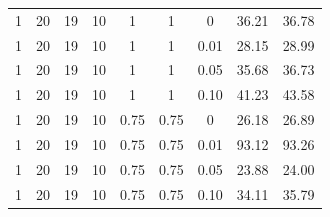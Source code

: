 \begin{table}[H]
\begin{tabular}{cccccccrr}
	1  			& 20     			& 19			& 10				& 1						& 1      				& 0			      		& 36.21 				& 36.78\\ 
	1      		& 20     			& 19     		& 10     			& 1      				& 1      				& 0.01    				& 28.15    				& 28.99\\ 
	1      		& 20     			& 19     		& 10     			& 1      				& 1      				& 0.05    				& 35.68    				& 36.73\\
	1      		& 20     			& 19     		& 10     			& 1      				& 1      				& 0.10    				& 41.23    				& 43.58\\
	1      		& 20     			& 19     		& 10     			& 0.75      			& 0.75      			& 0	    				& 26.18    				& 26.89\\
	1      		& 20     			& 19     		& 10     			& 0.75      			& 0.75      			& 0.01    				& 93.12    				& 93.26\\
	1      		& 20     			& 19     		& 10     			& 0.75      			& 0.75      			& 0.05    				& 23.88    				& 24.00\\
	1      		& 20     			& 19     		& 10     			& 0.75      			& 0.75      			& 0.10    				& 34.11    				& 35.79\\ 
    \bottomrule
  \end{tabular}
\end{table}

